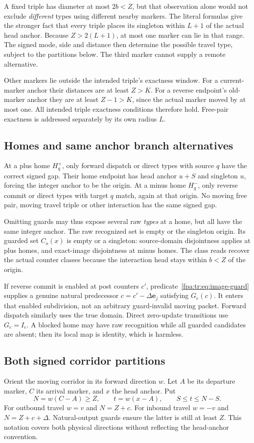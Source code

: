 \documentclass[11pt,a4paper]{article}
\numberwithin{equation}{section}
\begin{document}
A fixed triple has diameter at most $2b<Z$, but that observation alone would not exclude \emph{different} types using different nearby markers. The literal formulas give the stronger fact that every triple places its singleton within $L+1$ of the actual head anchor. Because $Z>2(L+1)$, at most one marker can lie in that range. The signed mode, side and distance then determine the possible travel type, subject to the partitions below. The third marker cannot supply a remote alternative.

Other markers lie outside the intended triple's exactness window. For a current-marker anchor their distances are at least $Z>K$. For a reverse endpoint's old-marker anchor they are at least $Z-1>K$, since the actual marker moved by at most one. All intended triple exactness conditions therefore hold. Free-pair exactness is addressed separately by its own radius $L$.

\subsection{Homes and same anchor branch alternatives}
At a plus home $H_q^+$, only forward dispatch or direct types with source $q$ have the correct signed gap. Their home endpoint has head anchor $u+S$ and singleton $u$, forcing the integer anchor to be the origin. At a minus home $H_q^-$, only reverse commit or direct types with target $q$ match, again at that origin. No moving free pair, moving travel triple or other interaction has the same signed gap.

Omitting guards may thus expose several raw \emph{types} at a home, but all have the same integer anchor. The raw recognized set is empty or the singleton origin. Its guarded set $C_o(x)$ is empty or a singleton: source-domain disjointness applies at plus homes, and exact-image disjointness at minus homes. The class reads recover the actual counter classes because the interaction head stays within $b<Z$ of the origin.

If reverse commit is enabled at post counters $c'$, predicate~\eqref{fpa:tr:eq:image-guard} supplies a genuine natural predecessor $c=c'-\Delta\mathbf e_j$ satisfying $G_e(c)$. It enters that enabled subdivision, not an arbitrary guard-invalid moving packet. Forward dispatch similarly uses the true domain. Direct zero-update transitions use $G_e=I_e$. A blocked home may have raw recognition while all guarded candidates are absent; then its local map is identity, which is harmless.

\subsection{Both signed corridor partitions}\label{fpa:tr:sec:corridors}
Orient the moving corridor in its forward direction $w$. Let $A$ be its departure marker, $C$ its arrival marker, and $x$ the head anchor. Put
\[
N=w(C-A)\ge Z,\qquad t=w(x-A),\qquad S\le t\le N-S.
\]
For outbound travel $w=v$ and $N=Z+c$. For inbound travel $w=-v$ and $N=Z+c+\Delta$. Natural-output guards ensure the latter is still at least $Z$. This notation covers both physical directions without reflecting the head-anchor convention.
\end{document}
